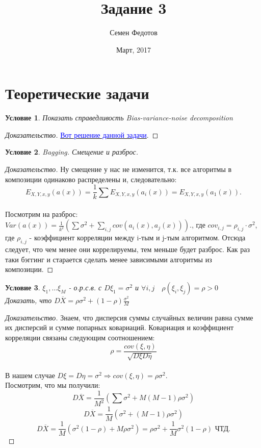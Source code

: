 \documentclass{article}
\title{Задание 3}
\author{Семен Федотов}
\date{Март, 2017}
\theoremstyle{plain}
\newtheorem{condi}{Условие}
\theoremstyle{definition}
\begin{document}
	\maketitle
	
\section{Теоретические задачи}
	
\begin{condi}
	Показать справедливость Bias-variance-noise decomposition
\end{condi}

\begin{proof}[Доказательство]
	\href{https://github.com/ml-mipt/ml-mipt-part1/blob/master/2017/seminars/03-pandas/bias_variance.pdf}{\textcolor{blue}{Вот решение данной задачи}}.
\end{proof}

\begin{condi}
	Bagging. Смещение и разброс.
\end{condi}

\begin{proof}[Доказательство]
	Ну смещение у нас не изменится, т.к. все алгоритмы в композиции одинаково распределены и, следовательно: $$E_{X,Y,x,y}(a(x)) = \frac{1}{k}\sum E_{X,Y,x,y}(a_i(x)) = E_{X,Y,x,y}(a_1(x)).$$ \\
	Посмотрим на разброс:
	$Var(a(x)) = \frac{1}{k^2}(\sum \sigma^2 + \sum\limits_{i,j} cov(a_i(x), a_j(x))).$, где $cov_{i,j} = \rho_{i,j} \cdot \sigma^2$, где $\rho_{i,j}$ - коэффициент корреляции между i-тым и j-тым алгоритмом. Отсюда следует, что чем менее они коррелируемы, тем меньше будет разброс. Как раз таки бэггинг и старается сделать менее зависимыми алгоритмы из композиции.
\end{proof}
	
\begin{condi}
	$\xi_1, \dots \xi_M$ - о.р.с.в. с $D\xi_1 = \sigma^2$  и $\forall i,j \quad \rho(\xi_i, \xi_j) = \rho > 0$ \\
	Доказать, что $D\overline{X} = \rho \sigma^2 + (1 - \rho) \frac{\sigma^2}{M}$
	
\end{condi}	
	
\begin{proof}[Доказательство]
	Знаем, что дисперсия суммы случайных величин равна сумме их дисперсий и сумме попарных ковариаций. Ковариация и коэффициент корреляции связаны следующим соотношением: $$\rho = \frac{cov(\xi, \eta)}{\sqrt{D\xi D\eta}}$$ \\
	В нашем случае $D\xi = D\eta = \sigma^2 \Rightarrow cov(\xi, \eta) = \rho \sigma^2$. \\
	Посмотрим, что мы получили: 
	$$ D\overline{X} = \frac{1}{M^2}(\sum \sigma^2 + M(M - 1)\rho \sigma^2 ) $$
	$$D\overline{X} = \frac{1}{M}(\sigma^2 + (M - 1)\rho \sigma^2 )$$
	$$D\overline{X} = \frac{1}{M}(\sigma^2(1 - \rho) +M\rho \sigma^2 ) = 
	\rho \sigma^2 + \frac{1}{M}\sigma^2(1 - \rho) \text{ ЧТД.}$$


\end{proof}	
\end{document}
